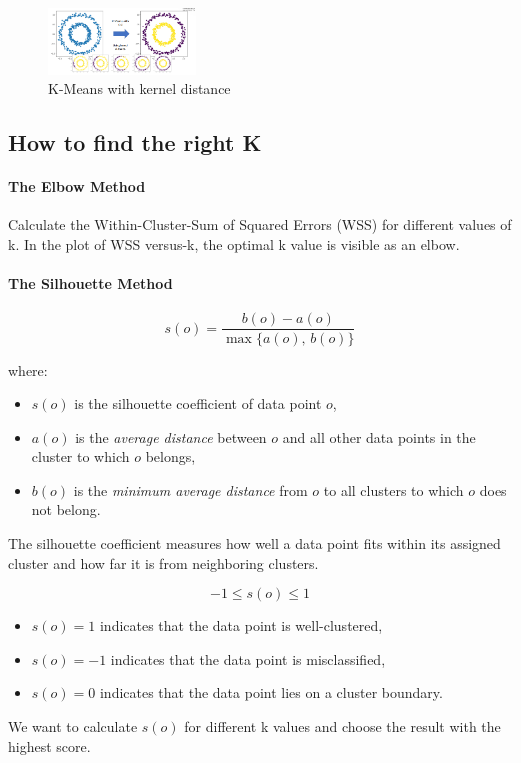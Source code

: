 \documentclass[11pt]{article}
\begin{document}
\begin{figure}[h]
	\centering
	\includegraphics[width=0.35\textwidth]{../imgs/kmeans-ker.png} 
	\caption{K-Means with kernel distance}
\end{figure}



\subsection*{How to find the right K}

\paragraph*{The Elbow Method}
Calculate the Within-Cluster-Sum of Squared Errors (WSS) for different values of k. In the plot of WSS versus-k, the optimal k value is visible as an elbow.

\paragraph*{The Silhouette Method}

\[
s(o) = \frac{b(o) - a(o)}{\max\{a(o),\, b(o)\}}
\]

\noindent where:
\begin{itemize}
    \item $s(o)$ is the silhouette coefficient of data point $o$,
    \item $a(o)$ is the \textit{average distance} between $o$ and all other data points in the cluster to which $o$ belongs,
    \item $b(o)$ is the \textit{minimum average distance} from $o$ to all clusters to which $o$ does not belong.
\end{itemize}

The silhouette coefficient measures how well a data point fits within its assigned cluster and how far it is from neighboring clusters.

\[
-1 \leq s(o) \leq 1
\]
\begin{itemize}
    \item $s(o) = 1$ indicates that the data point is well-clustered,
    \item $s(o) = -1$ indicates that the data point is misclassified,
    \item $s(o) = 0$ indicates that the data point lies on a cluster boundary.
\end{itemize}

We want to calculate $s(o)$ for different k values and choose the result with the highest score.
\end{document}
